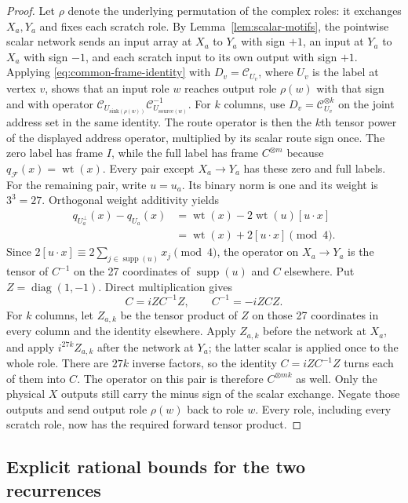 \begin{proof}
Let $\rho$ denote the underlying permutation of the complex roles: it
exchanges $X_a,Y_a$ and fixes each scratch role.
By Lemma~\ref{lem:scalar-motifs}, the pointwise scalar network sends an input array at
$X_a$ to $Y_a$ with sign $+1$, an input at $Y_a$ to $X_a$ with sign
$-1$, and each scratch input to its own output with sign $+1$.
Applying \eqref{eq:common-frame-identity} with $D_v=\mathcal C_{U_v}$,
where $U_v$ is the label at vertex $v$, shows that an input role $w$ reaches
output role $\rho(w)$ with that sign and with operator
$\mathcal C_{U_{\mathrm{sink}(\rho(w))}}
 \mathcal C_{U_{\mathrm{source}(w)}}^{-1}$.
For $k$ columns, use $D_v=\mathcal C_{U_v}^{\otimes k}$ on the joint
address set in the same identity.  The route operator is then the $k$th
tensor power of the displayed address operator, multiplied by its scalar
route sign once.
The zero label has frame $I$, while the full label has frame
$C^{\otimes m}$ because $q_{\mathcal F}(x)=\operatorname{wt}(x)$.
Every pair except $X_a\to Y_a$ has these zero and full labels.
For the remaining pair, write $u=u_a$.  Its binary norm is one and
its weight is $3^3=27$.  Orthogonal weight additivity yields
\begin{align*}
 q_{U_a^\perp}(x)-q_{U_a}(x)
 &=\operatorname{wt}(x)-2\operatorname{wt}(u)[u\cdot x]\\
 &=\operatorname{wt}(x)+2[u\cdot x]\pmod4.
\end{align*}
Since $2[u\cdot x]\equiv2\sum_{j\in\operatorname{supp}(u)}x_j
\pmod4$, the operator on $X_a\to Y_a$ is the tensor of $C^{-1}$ on the
27 coordinates of $\operatorname{supp}(u)$ and $C$ elsewhere.
Put $Z=\operatorname{diag}(1,-1)$.  Direct multiplication gives
\[
 C=iZC^{-1}Z,\qquad C^{-1}=-iZCZ.
\]
For $k$ columns, let $Z_{a,k}$ be the tensor product of $Z$ on
those 27 coordinates in every column and the identity elsewhere.
Apply $Z_{a,k}$ before the network at $X_a$, and apply
$i^{27k}Z_{a,k}$ after the network at $Y_a$; the latter scalar is
applied once to the whole role.  There are $27k$ inverse factors, so
the identity $C=iZC^{-1}Z$ turns each of them into $C$.  The operator
on this pair is therefore $C^{\otimes mk}$ as well.
Only the physical $X$ outputs still carry the minus sign of the
scalar exchange.  Negate those outputs and send output role $\rho(w)$
back to role $w$.  Every role, including every scratch role, now has
the required forward tensor product.
\end{proof}

\subsection{Explicit rational bounds for the two recurrences}

